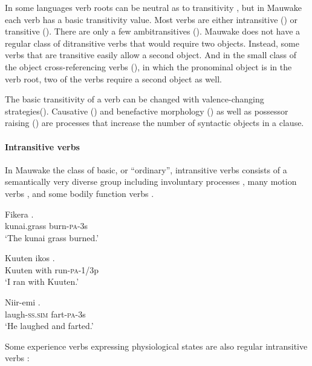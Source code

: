 In some languages verb roots can be neutral as to transitivity \citep[53]{Kittila2002}, but in Mauwake each verb has a basic transitivity value. Most verbs are either intransitive () or transitive (). There are only a few ambitransitives (). Mauwake does not have a regular class of ditransitive verbs that would require two objects. Instead, some verbs that are transitive easily allow a second object. And in the small class of the object cross-referencing verbs (), in which the pronominal object is in the verb root, two of the verbs require a second object as well. 

The basic transitivity of a verb can be changed with valence-changing strategies\linebreak (). Causative () and benefactive morphology () as well as possessor raising () are processes that increase the number of syntactic objects in a clause.

\paragraph{Intransitive verbs}\label{sec:3.8.4.2.1}
{}
In Mauwake the class of basic, or ``ordinary'', intransitive verbs consists of a semantically very diverse group including involuntary processes , many motion verbs , and some bodily function verbs .

\ea%
\label{ex:3:x266}
\gll Fikera . \\
kunai.grass burn-\textsc{pa}-3s \\
\glt`The kunai grass burned.'
\z

\ea%
\label{ex:3:x267}
\gll Kuuten ikos . \\
Kuuten with run-\textsc{pa}-1/3p \\
\glt`I ran with Kuuten.'
\z

\ea%
\label{ex:3:x269}
\gll Niir-emi . \\
laugh-\textsc{ss}.\textsc{sim} fart-\textsc{pa}-3s \\
\glt`He laughed and farted.'
\z

Some experience verbs expressing physiological states are also regular intransitive verbs :

